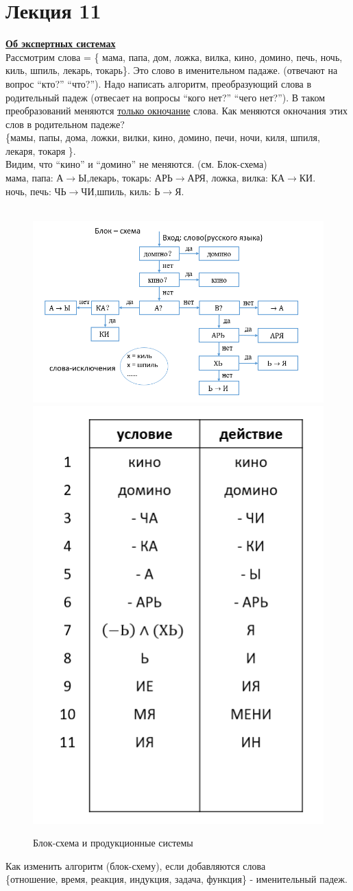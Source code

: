 \documentclass{article}
\numberwithin{example}{section}
\numberwithin{question}{section}
\numberwithin{Remark}{section}
\numberwithin{theorem}{section}
\numberwithin{definition}{section}
\numberwithin{proposition}{section}
\begin{document}
\section{Лекция 11}
\underline{\textbf{Об экспертных системах}}\\
Рассмотрим слова = \{ мама, папа, дом, ложка, вилка, кино, домино, печь, ночь, киль, шпиль, лекарь, токарь\}. Это слово в именительном падаже. (отвечают на вопрос ``кто?'' ``что?''). Надо написать алгоритм, преобразующий слова в родительный падеж (отвесает на вопросы ``кого нет?'' ``чего нет?''). В таком преобразований меняются \underline{только окночание} слова. Как меняются окночания этих слов в родительном падеже?\\
\{мамы, папы, дома, ложки, вилки, кино, домино, печи, ночи, киля, шпиля, лекаря, токаря \}.\\
Видим, что ``кино'' и ``домино'' не меняются. (см. Блок-схема)\\
мама, папа: А$\to$Ы,\quad лекарь, токарь: АРЬ$\to$АРЯ, \quad ложка, вилка: КА$\to$КИ.\\
ночь, печь: ЧЬ$\to$ЧИ,\quad шпиль, киль: Ь$\to$Я.\\
\\
\begin{figure}[!htp]
	\centering
	\includegraphics[width=0.6\linewidth]{11-1}
	\includegraphics[width=0.3\linewidth]{11-2}
	\caption{Блок-схема и продукционные системы}
	\label{fig:11-1}
\end{figure}
Как изменить алгоритм (блок-схему), если добавляются слова\\ \{отношение, время, реакция, индукция, задача, функция\} - именительный падеж.\\
\end{document}
